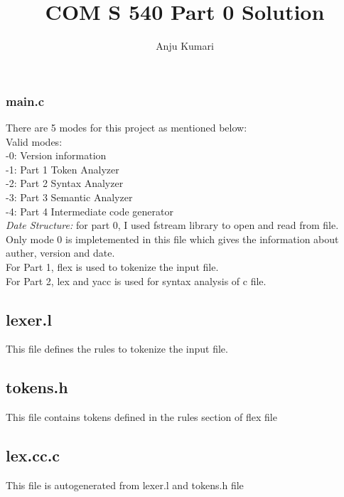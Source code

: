 \documentclass{article}
\title{COM S 540 Part 0 Solution}
\author{Anju Kumari}
\date{}
\begin{document}
   

\maketitle
\section*{}

\subsubsection*{main.c}
There are 5 modes for this project as mentioned below: \\
Valid modes: \\
-0: Version information \\
-1: Part 1 Token Analyzer \\
-2: Part 2 Syntax Analyzer\\
-3: Part 3 Semantic Analyzer \\
-4: Part 4 Intermediate code generator \\

{\it Date Structure:} for part 0, I used fstream library to open and read from file. \\
Only mode 0 is impletemented in this file which gives the information about auther, version and date. \\
For Part 1, flex is used to tokenize the input file. \\
For Part 2, lex and yacc is used for syntax analysis of c file. \\

\subsection*{lexer.l}
This file defines the rules to tokenize the input file.

\subsection*{tokens.h}
This file contains tokens defined in the rules section of flex file\\

\subsection*{lex.cc.c}
This file is autogenerated from lexer.l and tokens.h file \\
\end{document}
